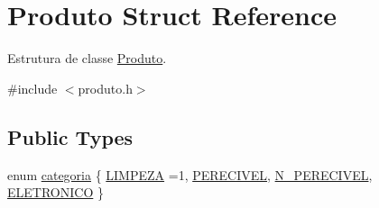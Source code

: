 \hypertarget{structProduto}{}\section{Produto Struct Reference}
\label{structProduto}


Estrutura de classe \hyperlink{structProduto}{Produto}.  




{\ttfamily \#include $<$produto.\+h$>$}

\subsection*{Public Types}
\begin{DoxyCompactItemize}
\item 
enum \hyperlink{structProduto_a790d0998d9d717ef53640efea920b427}{categoria} \{ \hyperlink{structProduto_a790d0998d9d717ef53640efea920b427a5310346786adabb17133d71da1fa944a}{L\+I\+M\+P\+E\+ZA} =1, 
\hyperlink{structProduto_a790d0998d9d717ef53640efea920b427a0aa2f4136fd4d19dde08e2e157bb2028}{P\+E\+R\+E\+C\+I\+V\+EL}, 
\hyperlink{structProduto_a790d0998d9d717ef53640efea920b427a911227fdf7dae8e6d2e52b269b658d06}{N\+\_\+\+P\+E\+R\+E\+C\+I\+V\+EL}, 
\hyperlink{structProduto_a790d0998d9d717ef53640efea920b427a11f8d1b2609a34d95a5274a202632154}{E\+L\+E\+T\+R\+O\+N\+I\+CO}
 \}
\end{DoxyCompactItemize}
